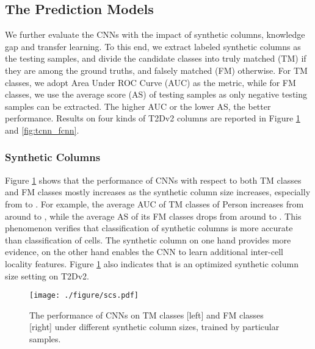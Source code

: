 \documentclass[letterpaper]{article}
\newcommand{\rv}[1]{{\color{black}#1}}
\newcommand{\camera}[1]{{\color{black}#1}}
\begin{document}
\subsection{The Prediction Models}
We further evaluate the \rv{CNNs}
with the impact of synthetic columns, knowledge gap and transfer learning.
To this end,
we extract \rv{labeled synthetic columns as the testing samples, 
and} divide the candidate classes into truly matched (TM) if they are among the ground truths,
and falsely matched (FM) otherwise.
For TM classes, we adopt Area Under ROC Curve (AUC) as the metric,
while for FM classes,
we use the average score (AS) of testing samples as only negative testing samples can be extracted.
The higher AUC or the lower AS, the better performance.
Results on four kinds of T2Dv2 columns are reported in Figure \ref{fig:scs} and \ref{fig:tcnn_fcnn}.



\subsubsection{Synthetic Columns}
Figure \ref{fig:scs} 
\camera{shows}
that
the performance of CNNs \camera{with respect to} both TM classes and FM classes mostly increases as the synthetic column size increases, 
especially from  to .
For example, the average AUC of TM classes of Person increases from around  to ,
while the average AS of its FM classes drops from around  to .
This phenomenon verifies that \rv{classification of synthetic columns 
is more accurate than classification of cells}.
The synthetic column on one hand provides more evidence,
on the other hand enables the CNN to learn additional inter-cell locality features.
Figure \ref{fig:scs} also 
\camera{indicates}
that
 is an optimized synthetic column size setting on T2Dv2. 


\begin{figure}[!t]
\centering
\texttt{[image: ./figure/scs.pdf]}
\caption{The performance of CNNs \camera{on} TM classes  [left] and FM classes [right] under different synthetic column sizes, \rv{trained by particular samples}.}
\label{fig:scs}
\end{figure}
\end{document}
